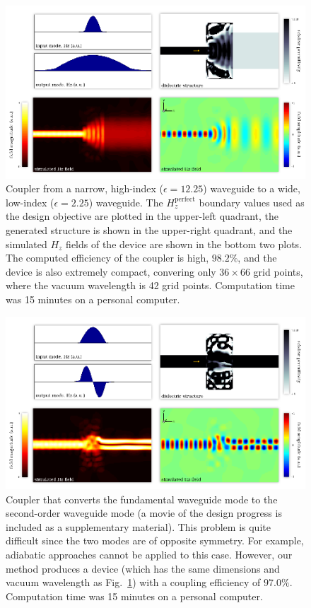 \documentclass[letterpaper,10pt]{article}
\begin{document}
\begin{figure}[htbp]
    \centering
    \includegraphics[width=\textwidth]{1} 
    \caption{Coupler from a narrow, high-index ($\epsilon=12.25$) waveguide to
            a wide, low-index ($\epsilon=2.25$) waveguide. 
        The $H_z^\text{perfect}$ boundary values used as 
            the design objective are plotted in the upper-left quadrant, 
            the generated structure is shown in the upper-right quadrant, and
            the simulated $H_z$ fields of the device are shown 
            in the bottom two plots.
        The computed efficiency of the coupler is high, $98.2\%$, and
            the device is also extremely compact, 
            convering only $36 \times 66$ grid points,
            where the vacuum wavelength is 42 grid points.
        Computation time was 15 minutes on a personal computer.}
    \label{fig:fiber}
\end{figure}
\begin{figure}[htbp]
    \centering
    \includegraphics[width=\textwidth]{2} 
    \caption{Coupler that converts the fundamental waveguide mode to the
            second-order waveguide mode
            (a movie of the design progress is included as a
            supplementary material).
        This problem is quite difficult since the two modes are of 
            opposite symmetry.
        For example, adiabatic approaches cannot be applied to this case.
        However, our method produces a device 
            (which has the same dimensions and vacuum wavelength as 
            Fig.~\ref{fig:fiber})  
            with a coupling efficiency of $97.0\%$. 
        Computation time was 15 minutes on a personal computer.
        }
    \label{fig:mode}
\end{figure}
\end{document}
